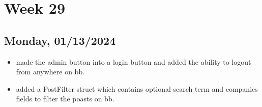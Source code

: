 \newpage
\section{Week 29}

\subsection{Monday, 01/13/2024}
\begin{itemize}
    \item made the admin button into a login button and added the ability to
        logout from anywhere on bb.
    \item added a PostFilter struct which contains optional search term and
        companies fields to filter the poasts on bb.
\end{itemize}
